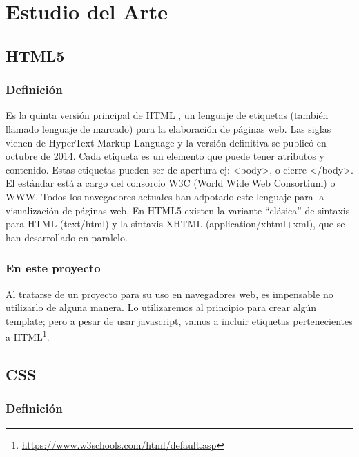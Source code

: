 \documentclass[a4paper, 12pt]{book}
\begin{document}
\cleardoublepage
\chapter{Estudio del Arte}
\label{sec:estudioarte} %



\section{HTML5}
\label{sec:html5}
\subsection{Definición}

Es la quinta versión principal de HTML \cite{pilgrim:_html5guide}, un lenguaje de etiquetas (también llamado lenguaje de marcado) para la elaboración de páginas web. Las siglas vienen de HyperText Markup Language y la versión definitiva se publicó en octubre de 2014. Cada etiqueta es un elemento que puede tener atributos y contenido. Estas etiquetas pueden ser de apertura ej: <body>, o cierre </body>. El estándar está a cargo del consorcio W3C (World Wide Web Consortium) o WWW. Todos los navegadores actuales han adpotado este lenguaje para la visualización de páginas web. En HTML5 existen la variante “clásica” de sintaxis para HTML (text/html) y la sintaxis XHTML (application/xhtml+xml), que se han desarrollado en paralelo.

\subsection{En este proyecto}

Al tratarse de un proyecto para su uso en navegadores web, es impensable no utilizarlo de alguna manera. Lo utilizaremos al principio para crear algún template; pero a pesar de usar javascript, vamos a incluir etiquetas pertenecientes a HTML\footnote{\url{https://www.w3schools.com/html/default.asp}}.



\section{CSS}
\label{sec:css}
\subsection{Definición}
\end{document}
